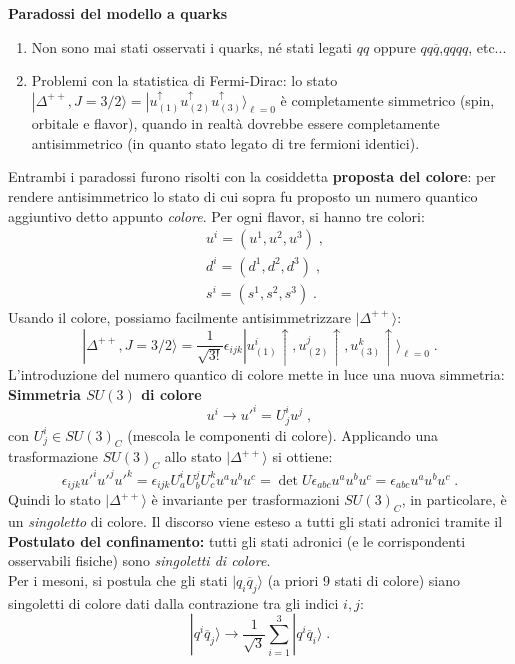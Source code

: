 \documentclass[12pt,a4paper]{article}
\theoremstyle{definition}
\newcommand{\ket}{\rangle}
\numberwithin{equation}{section}
\begin{document}
\textbf{Paradossi del modello a quarks} \\
\begin{enumerate}
\item Non sono mai stati osservati i quarks, né stati legati $qq$ oppure $qq\overline{q}$,$qqqq$, etc...
\item Problemi con la statistica di Fermi-Dirac: lo stato $|\Delta^{++},J=3/2\ket=|u_{(1)}^{\uparrow}u_{(2)}^{\uparrow}u_{(3)}^{\uparrow}\ket_{\ell=0}$ è completamente simmetrico (spin, orbitale e flavor), quando in realtà dovrebbe essere completamente antisimmetrico (in quanto stato legato di tre fermioni identici).
\end{enumerate}
Entrambi i paradossi furono risolti con la cosiddetta \textbf{proposta del colore}: per rendere antisimmetrico lo stato di cui sopra fu proposto un numero quantico aggiuntivo detto appunto \emph{colore}. Per ogni flavor, si hanno tre colori:
\begin{align*}
&u^i=(u^1,u^2,u^3)\;, \\
&d^i=(d^1,d^2,d^3)\;, \\
&s^i=(s^1,s^2,s^3)\;.
\end{align*}
Usando il colore, possiamo facilmente antisimmetrizzare $|\Delta^{++}\ket$:
\begin{equation}
|\Delta^{++},J=3/2\ket=\frac{1}{\sqrt{3!}}\epsilon_{ijk}|u^i_{(1)}\uparrow,u^j_{(2)}\uparrow,u^k_{(3)}\uparrow\ket_{\ell=0}\;.
\end{equation}
L'introduzione del numero quantico di colore mette in luce una nuova simmetria: \\
\textbf{Simmetria $SU(3)$ di colore}
$$
u^i\longrightarrow u'^i=U^i_ju^j\;,
$$
con $U^i_j\in SU(3)_C$ (mescola le componenti di colore). Applicando una trasformazione $SU(3)_C$ allo stato $|\Delta^{++}\ket$ si ottiene:
$$
\epsilon_{ijk}u'^iu'^ju'^k=\epsilon_{ijk}U^i_aU^j_bU^k_cu^au^bu^c=\det U\epsilon_{abc}u^au^bu^c=\epsilon_{abc}u^au^bu^c\;.
$$
Quindi lo stato $|\Delta^{++}\ket$ è invariante per trasformazioni $SU(3)_C$, in particolare, è un \emph{singoletto} di colore. Il discorso viene esteso a tutti gli stati adronici tramite il \\
\textbf{Postulato del confinamento:} tutti gli stati adronici (e le corrispondenti osservabili fisiche) sono \emph{singoletti di colore}. \\
Per i mesoni, si postula che gli stati $|q_i\overline{q}_j\ket$ (a priori 9 stati di colore) siano singoletti di colore dati dalla contrazione tra gli indici $i,j$:
$$
|q^i\overline{q}_j\ket\longrightarrow\frac{1}{\sqrt{3}}\sum_{i=1}^3|q^i\overline{q}_i\ket\;.
$$
\end{document}
